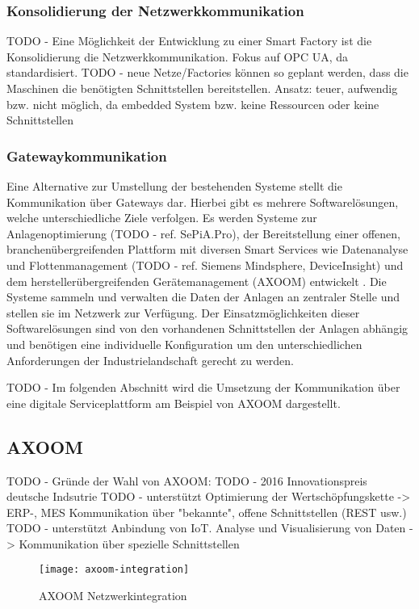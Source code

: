 \subsubsection{Konsolidierung der Netzwerkkommunikation}
TODO - Eine Möglichkeit der Entwicklung zu einer Smart Factory ist die Konsolidierung die Netzwerkkommunikation. Fokus auf OPC UA, da standardisiert.
TODO - neue Netze/Factories können so geplant werden, dass die Maschinen die benötigten Schnittstellen bereitstellen.
Ansatz: teuer, aufwendig bzw. nicht möglich, da embedded System bzw. keine Ressourcen oder keine Schnittstellen

\subsubsection{Gatewaykommunikation}
Eine Alternative zur Umstellung der bestehenden Systeme stellt die Kommunikation über Gateways dar. Hierbei gibt es mehrere Softwarelösungen, welche unterschiedliche Ziele verfolgen. Es werden Systeme zur Anlagenoptimierung (TODO - ref. SePiA.Pro), der Bereitstellung einer offenen, branchenübergreifenden Plattform mit diversen Smart Services wie Datenanalyse und Flottenmanagement (TODO - ref. Siemens Mindsphere, DeviceInsight) und dem herstellerübergreifenden Gerätemanagement (AXOOM) entwickelt \cite{acatec2016}. Die Systeme sammeln und verwalten die Daten der Anlagen an zentraler Stelle und stellen sie im Netzwerk zur Verfügung. Der Einsatzmöglichkeiten dieser Softwarelösungen sind von den vorhandenen Schnittstellen der Anlagen abhängig und benötigen eine individuelle Konfiguration um den unterschiedlichen Anforderungen der Industrielandschaft gerecht zu werden.

TODO - Im folgenden Abschnitt wird die Umsetzung der Kommunikation über eine digitale Serviceplattform am Beispiel von AXOOM dargestellt.

\subsection{AXOOM}
TODO - Gründe der Wahl von AXOOM: 
TODO - 2016 Innovationspreis deutsche Indsutrie
TODO - unterstützt Optimierung der Wertschöpfungskette -> ERP-, MES Kommunikation über "bekannte", offene Schnittstellen (REST usw.) 
TODO - unterstützt Anbindung von \ac{IoT}. Analyse und Visualisierung von Daten -> Kommunikation über spezielle Schnittstellen

\begin{figure}[h]
    \centering
    \texttt{[image: axoom-integration]}
    \caption{AXOOM Netzwerkintegration}
    \label{Kap3:AXOOM Netzwerkintegration}
  \end{figure}
  
